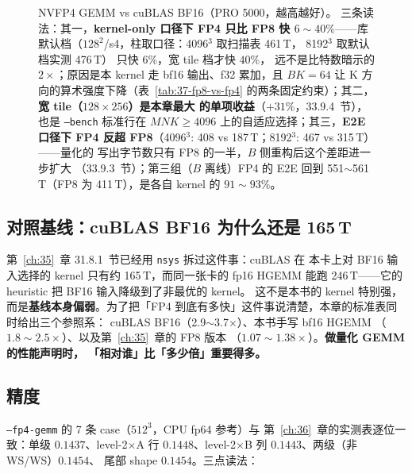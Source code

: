 \begin{figure}[H]
\caption{NVFP4 GEMM vs cuBLAS BF16（PRO 5000，越高越好）。
三条读法：其一，\textbf{kernel-only 口径下 FP4 只比 FP8 快
$6\sim40\%$}——库默认档（$128^2$/s4，柱取口径：4096$^3$ 取扫描表 461\,T，
8192$^3$ 取默认档实测 476\,T）
只快 $6\%$，宽 tile 档才快 $40\%$，
远不是比特数暗示的 $2\times$；原因是本 kernel 走 bf16 输出、f32
累加，且 $BK{=}64$ 让 K 方向的算术强度下降（表~\ref{tab:37-fp8-vs-fp4}
的两条固定约束）；其二，\textbf{宽 tile（$128{\times}256$）是本章最大
的单项收益}（$+31\%$，33.9.4~节），也是 \texttt{--bench} 标准行在
$MNK\ge4096$ 上的自适应选择；其三，\textbf{E2E 口径下 FP4 反超
FP8}（4096$^3$: 408 vs 187\,T；8192$^3$: 467 vs 315\,T）——量化的
写出字节数只有 FP8 的一半，$B$ 侧重构后这个差距进一步扩大
（33.9.3~节）；第三组（$B$ 离线）FP4 的 E2E 回到
551$\sim$561\,T（FP8 为 411\,T），是各自 kernel 的 $91\sim93\%$。}
\label{fig:37-perf}
\end{figure}

\subsection{对照基线：cuBLAS BF16 为什么还是 165\,T}

第~\ref{ch:35}~章 31.8.1~节已经用 \texttt{nsys} 拆过这件事：cuBLAS 在
本卡上对 BF16 输入选择的 kernel 只有约 165\,T，而同一张卡的 fp16 HGEMM
能跑 246\,T——它的 heuristic 把 BF16 输入降级到了非最优的 kernel。
这不是本书的 kernel 特别强，而是\textbf{基线本身偏弱}。为了把「FP4
到底有多快」这件事说清楚，本章的标准表同时给出三个参照系：
cuBLAS BF16（2.9$\sim$3.7$\times$）、本书手写 bf16 HGEMM
（$1.8\sim2.5\times$）、以及第~\ref{ch:35}~章的 FP8 版本
（$1.07\sim1.38\times$）。\textbf{做量化 GEMM 的性能声明时，
「相对谁」比「多少倍」重要得多。}

\subsection{精度}

\texttt{--fp4-gemm} 的 7 条 case（$512^3$，CPU fp64 参考）与
第~\ref{ch:36}~章的实测表逐位一致：单级 $0.1437$、level-2$\times$A 行
$0.1448$、level-2$\times$B 列 $0.1443$、两级（非 WS/WS）$0.1454$、
尾部 shape $0.1454$。三点读法：

